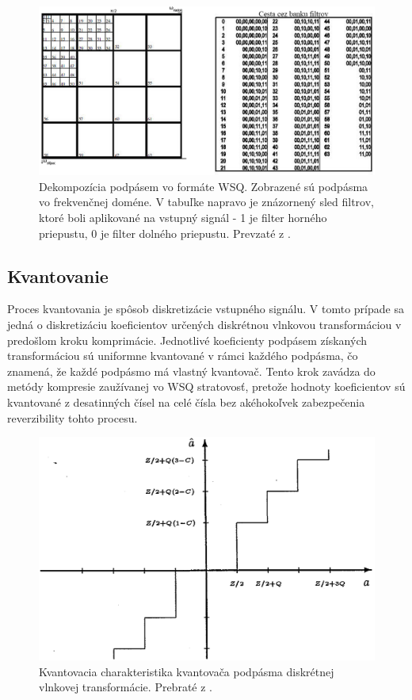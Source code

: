  \begin{figure}[h]
    \centering
    \includegraphics[width=\linewidth]{obrazky-figures/WSQ_DWT_subband_decomposition.png}
    \caption{Dekompozícia podpásem vo formáte WSQ. Zobrazené sú podpásma vo frekvenčnej doméne. V tabuľke napravo je znázornený sled filtrov, ktoré boli
    aplikované na vstupný signál - 1 je filter horného priepustu, 0 je filter dolného priepustu. Prevzaté z \cite{WSQSpecification}.}
    \label{obr:WSQ_DWT_dekompozicia}
  \end{figure}

  \subsection{Kvantovanie}
  Proces kvantovania je spôsob diskretizácie vstupného signálu. V tomto prípade sa jedná o diskretizáciu koeficientov určených diskrétnou vlnkovou
  transformáciou v predošlom kroku komprimácie. Jednotlivé koeficienty podpásem získaných transformáciou sú uniformne kvantované v rámci každého podpásma,
  čo znamená, že každé podpásmo má vlastný kvantovač. Tento krok zavádza do metódy kompresie zaužívanej vo WSQ stratovosť, pretože hodnoty koeficientov
  sú kvantované z desatinných čísel na celé čísla bez akéhokoľvek zabezpečenia reverzibility tohto procesu.

  \begin{figure}[h]
    \centering
    \includegraphics[width=0.6\linewidth]{obrazky-figures/wsq_kvantovacia_charakteristika.png}
    \caption{Kvantovacia charakteristika kvantovača podpásma diskrétnej vlnkovej transformácie. Prebraté z \cite{brislawn1996compression}.}
    \label{obr:wsq_kvantovacia_charakteristika}
  \end{figure}

